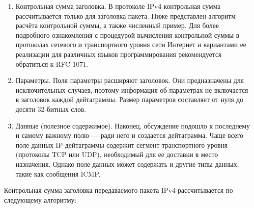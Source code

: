 \begin{enumerate}
	\item Контрольная сумма заголовка. В протоколе IPv4 контрольная сумма рассчитывается только для заголовка пакета. Ниже представлен алгоритм расчёта контрольной суммы, а также численный пример. Для более подробного ознакомления с процедурой вычисления контрольной суммы в протоколах сетевого и транспортного уровня сети Интернет и
	вариантами ее реализации для различных языков программирования рекомендуется обратиться к RFC 1071.
	\item Параметры. Поля параметры расширяют заголовок. Они предназначены для
	исключительных случаев, поэтому информация об параметрах не включается в заголовок каждой дейтаграммы. Размер параметров составляет от нуля до десяти 32-битных слов.
	\item Данные (полезное содержимое). Наконец, обсуждение подошло к последнему и самому важному полю — ради него и создается дейтаграмма. Чаще всего поле данных IP-дейтаграммы содержит сегмент транспортного уровня (протоколы TCP или UDP), необходимый для ее доставки в место назначения. Однако поле данных может содержать и другие типы данных, такие как сообщения ICMP.
\end{enumerate}


Контрольная сумма заголовка передаваемого пакета IPv4 рассчитывается по следующему алгоритму:

